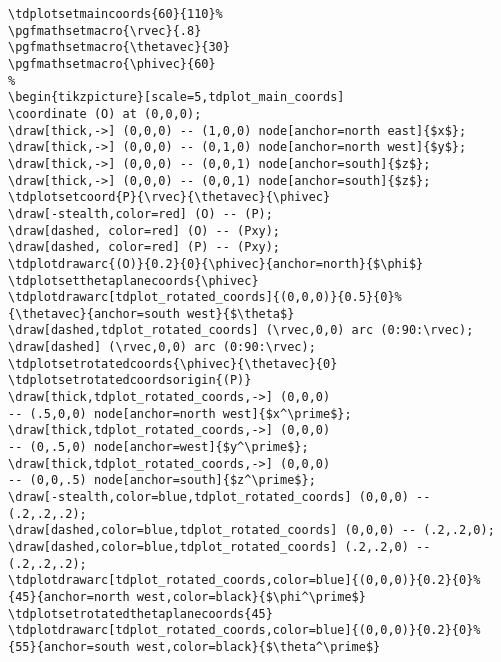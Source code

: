 \documentclass{report}
\begin{document}
\begin{verbatim}
\tdplotsetmaincoords{60}{110}%
\pgfmathsetmacro{\rvec}{.8}
\pgfmathsetmacro{\thetavec}{30}
\pgfmathsetmacro{\phivec}{60}
%
\begin{tikzpicture}[scale=5,tdplot_main_coords]
\coordinate (O) at (0,0,0); 
\draw[thick,->] (0,0,0) -- (1,0,0) node[anchor=north east]{$x$}; 
\draw[thick,->] (0,0,0) -- (0,1,0) node[anchor=north west]{$y$};
\draw[thick,->] (0,0,0) -- (0,0,1) node[anchor=south]{$z$}; \draw[thick,->] (0,0,0) -- (0,0,1) node[anchor=south]{$z$};
\tdplotsetcoord{P}{\rvec}{\thetavec}{\phivec}
\draw[-stealth,color=red] (O) -- (P);
\draw[dashed, color=red] (O) -- (Pxy);
\draw[dashed, color=red] (P) -- (Pxy);
\tdplotdrawarc{(O)}{0.2}{0}{\phivec}{anchor=north}{$\phi$}
\tdplotsetthetaplanecoords{\phivec}
\tdplotdrawarc[tdplot_rotated_coords]{(0,0,0)}{0.5}{0}%
{\thetavec}{anchor=south west}{$\theta$}
\draw[dashed,tdplot_rotated_coords] (\rvec,0,0) arc (0:90:\rvec);
\draw[dashed] (\rvec,0,0) arc (0:90:\rvec);
\tdplotsetrotatedcoords{\phivec}{\thetavec}{0}
\tdplotsetrotatedcoordsorigin{(P)}
\draw[thick,tdplot_rotated_coords,->] (0,0,0)
-- (.5,0,0) node[anchor=north west]{$x^\prime$};
\draw[thick,tdplot_rotated_coords,->] (0,0,0)
-- (0,.5,0) node[anchor=west]{$y^\prime$};
\draw[thick,tdplot_rotated_coords,->] (0,0,0)
-- (0,0,.5) node[anchor=south]{$z^\prime$};
\draw[-stealth,color=blue,tdplot_rotated_coords] (0,0,0) -- (.2,.2,.2);
\draw[dashed,color=blue,tdplot_rotated_coords] (0,0,0) -- (.2,.2,0);
\draw[dashed,color=blue,tdplot_rotated_coords] (.2,.2,0) -- (.2,.2,.2);
\tdplotdrawarc[tdplot_rotated_coords,color=blue]{(0,0,0)}{0.2}{0}%
{45}{anchor=north west,color=black}{$\phi^\prime$}
\tdplotsetrotatedthetaplanecoords{45}
\tdplotdrawarc[tdplot_rotated_coords,color=blue]{(0,0,0)}{0.2}{0}%
{55}{anchor=south west,color=black}{$\theta^\prime$}
\end{verbatim}


%
%
\end{document}
